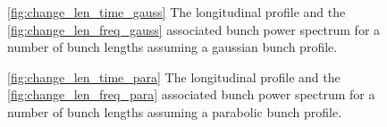 \begin{figure}
\label{fig:diff_bunch_len_gauss}
\caption{\ref{fig:change_len_time_gauss} The longitudinal profile and the \ref{fig:change_len_freq_gauss} associated bunch power spectrum for a number of bunch lengths assuming a gaussian bunch profile.}
\end{figure}

\begin{figure}
\label{fig:diff_bunch_len_para}
\caption{\ref{fig:change_len_time_para} The longitudinal profile and the \ref{fig:change_len_freq_para} associated bunch power spectrum for a number of bunch lengths assuming a parabolic bunch profile.}
\end{figure}

